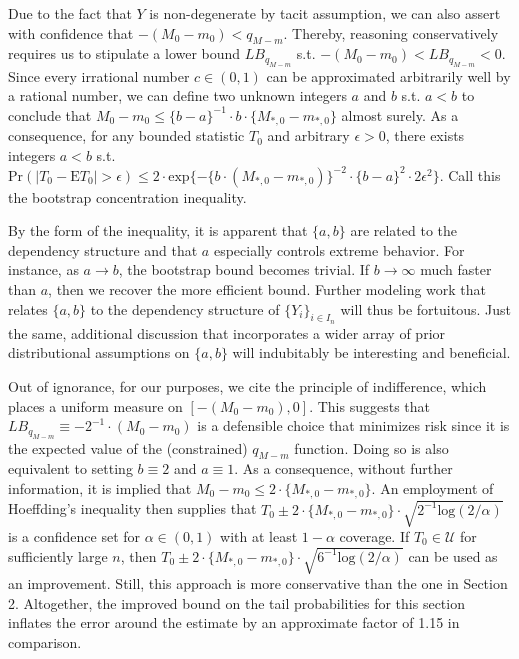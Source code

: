 \documentclass[12pt]{amsart}
\theoremstyle{plain}%
\theoremstyle{definition}
\theoremstyle{remark}
\numberwithin{equation}{section}
\begin{document}
Due to the fact that $Y$ is non-degenerate by tacit assumption, we can also assert with confidence that $-(M_0 - m_0) < q_{M-m}$. Thereby, reasoning conservatively requires us to stipulate a lower bound $LB_{q_{M-m}}$ s.t. $-(M_0 - m_0) < LB_{q_{M-m}} < 0$. Since every irrational number $c \in (0, 1)$ can be approximated arbitrarily well by a rational number, we can define two unknown integers $a$ and $b$ s.t. $a < b$ to conclude that $M_0 - m_0 \leq \{b - a \}^{-1} \cdot b \cdot \{ M_{*, 0} - m_{*, 0} \}$ almost surely. As a consequence, for any bounded statistic $T_0$ and arbitrary $\epsilon > 0$, there exists integers $a < b$ s.t. $\text{Pr}(|T_0 - \text{E}T_0| > \epsilon) \leq 2 \cdot \text{exp} \{- \{b \cdot (M_{*, 0} - m_{*, 0}  ) \}^{-2} \cdot \{ b-a \}^2 \cdot 2\epsilon^2  \}$. Call this the bootstrap concentration inequality.

By the form of the inequality, it is apparent that $\{a, b \}$ are related to the dependency structure and that $a$ especially controls extreme behavior. For instance, as $a \to b$, the bootstrap bound becomes trivial. If $b \to \infty$ much faster than $a$, then we recover the more efficient bound. Further modeling work that relates $\{a, b \}$ to the dependency structure of $\{Y_i \}_{i \in I_n}$ will thus be fortuitous. Just the same, additional discussion that incorporates a wider array of prior distributional assumptions on $\{a, b \}$ will indubitably be interesting and beneficial.

Out of ignorance, for our purposes, we cite the principle of indifference, which places a uniform measure on $[-(M_0 - m_0), 0]$. This suggests that $LB_{q_{M-m}} \equiv -2^{-1} \cdot (M_0 -m_0)$ is a defensible choice that minimizes risk since it is the expected value of the (constrained) $q_{M-m}$ function. Doing so is also equivalent to setting $b \equiv 2$ and $a \equiv 1$. As a consequence, without further information, it is implied that $M_0 - m_0 \leq 2 \cdot \{ M_{*, 0} - m_{*, 0} \}$. An employment of Hoeffding's inequality then supplies that $T_0 \pm 2 \cdot \{  M_{*, 0} - m_{*, 0} \} \cdot \sqrt{2^{-1} \text{log}(2/\alpha)}$ is a confidence set for $\alpha \in (0, 1)$ with at least $1-\alpha$ coverage. If $T_0 \in \mathcal{U}$ for sufficiently large $n$, then $T_0 \pm 2 \cdot \{  M_{*, 0} - m_{*, 0} \} \cdot \sqrt{6^{-1} \text{log}(2/\alpha)}$ can be used as an improvement. Still, this approach is more conservative than the one in Section 2. Altogether, the improved bound on the tail probabilities for this section inflates the error around the estimate by an approximate factor of 1.15 in comparison.
\end{document}
